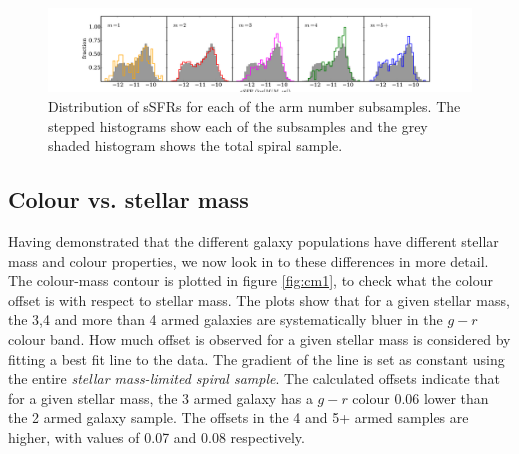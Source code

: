 \documentclass[useAMS,usenatbib]{mn2e}
\begin{document}
\begin{figure}
		\centering
		
        \includegraphics[width=1\textwidth]{Results_imgs/ssfr_histogram.pdf}
		
        \caption{Distribution of sSFRs for each of the arm number subsamples. The stepped histograms show each of the subsamples and the grey shaded histogram shows the total spiral sample.}
		
        \label{fig:ssfr_histogram}
        
\end{figure}

\subsection{Colour vs. stellar mass}
\label{sec:colour_mass}

Having demonstrated that the different galaxy populations have different stellar mass and colour properties, we now look in to these differences in more detail. The colour-mass contour is plotted in figure \ref{fig:cm1}, to check what the colour offset is with respect to stellar mass. The plots show that for a given stellar mass, the 3,4 and more than 4 armed galaxies are systematically bluer in the $g-r$ colour band. How much offset is observed for a given stellar mass is considered by fitting a best fit line to the data. The gradient of the line is set as constant using the entire \textit{stellar mass-limited spiral sample}. The calculated offsets indicate that for a given stellar mass, the 3 armed galaxy has a $g-r$ colour 0.06 lower than the 2 armed galaxy sample. The offsets in the 4 and 5+ armed samples are higher, with values of 0.07 and 0.08 respectively.
\end{document}
